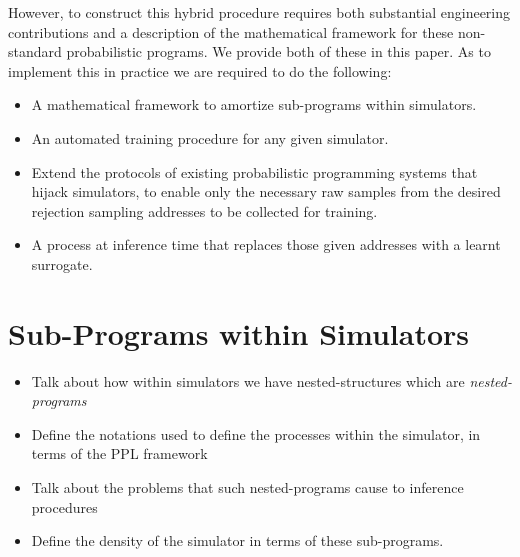 \documentclass{article}
\begin{document}
However, to construct this hybrid procedure requires both substantial engineering contributions 
and a description of the mathematical framework for these non-standard probabilistic programs. 
We provide both of these in this paper. As to implement this in practice we are required to do the following:
 \begin{itemize}
  \item A mathematical framework to amortize sub-programs within simulators. 
    \item An automated training procedure for any given simulator.
    \item Extend the protocols of existing probabilistic programming systems that hijack simulators, 
    to enable only the necessary raw samples from the desired rejection sampling addresses to be collected for training.
    \item A process at inference time that replaces those given addresses with a learnt surrogate.
  \end{itemize}


\section{Sub-Programs within Simulators}

\begin{itemize}
  \item Talk about how within simulators we have nested-structures which are \emph{nested-programs}
  \item Define the notations used to define the processes within the simulator, in terms of the PPL framework
  \item Talk about the problems that such nested-programs cause to inference procedures
  \item Define the density of the simulator in terms of these sub-programs. 
\end{itemize}
\end{document}
